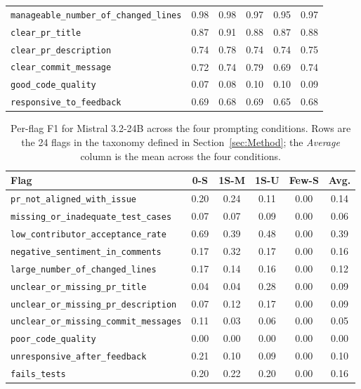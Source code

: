 \begin{table}[!htbp]
\begin{tabular}{lccccc}
\texttt{manageable\_number\_of\_changed\_lines} & 0.98 & 0.98 & 0.97 & 0.95 & 0.97 \\
\texttt{clear\_pr\_title} & 0.87 & 0.91 & 0.88 & 0.87 & 0.88 \\
\texttt{clear\_pr\_description} & 0.74 & 0.78 & 0.74 & 0.74 & 0.75 \\
\texttt{clear\_commit\_message} & 0.72 & 0.74 & 0.79 & 0.69 & 0.74 \\
\texttt{good\_code\_quality} & 0.07 & 0.08 & 0.10 & 0.10 & 0.09 \\
\texttt{responsive\_to\_feedback} & 0.69 & 0.68 & 0.69 & 0.65 & 0.68 \\
\bottomrule
\end{tabular}
\end{table}


\begin{table}[!htbp]
\centering
\caption{Per-flag F1 for Mistral 3.2-24B across the four prompting
conditions. Rows are the 24 flags in the taxonomy defined in
Section~\ref{sec:Method}; the \emph{Average} column is the mean across
the four conditions.}
\label{tab:perflag-mistral-3-2-24b}
\small
\begin{tabular}{lccccc}
\toprule
Flag & 0-S & 1S-M & 1S-U & Few-S & Avg. \\
\midrule
\texttt{pr\_not\_aligned\_with\_issue} & 0.20 & 0.24 & 0.11 & 0.00 & 0.14 \\
\texttt{missing\_or\_inadequate\_test\_cases} & 0.07 & 0.07 & 0.09 & 0.00 & 0.06 \\
\texttt{low\_contributor\_acceptance\_rate} & 0.69 & 0.39 & 0.48 & 0.00 & 0.39 \\
\texttt{negative\_sentiment\_in\_comments} & 0.17 & 0.32 & 0.17 & 0.00 & 0.16 \\
\texttt{large\_number\_of\_changed\_lines} & 0.17 & 0.14 & 0.16 & 0.00 & 0.12 \\
\texttt{unclear\_or\_missing\_pr\_title} & 0.04 & 0.04 & 0.28 & 0.00 & 0.09 \\
\texttt{unclear\_or\_missing\_pr\_description} & 0.07 & 0.12 & 0.17 & 0.00 & 0.09 \\
\texttt{unclear\_or\_missing\_commit\_messages} & 0.11 & 0.03 & 0.06 & 0.00 & 0.05 \\
\texttt{poor\_code\_quality} & 0.00 & 0.00 & 0.00 & 0.00 & 0.00 \\
\texttt{unresponsive\_after\_feedback} & 0.21 & 0.10 & 0.09 & 0.00 & 0.10 \\
\texttt{fails\_tests} & 0.20 & 0.22 & 0.20 & 0.00 & 0.16 \\

\end{tabular}
\end{table}
